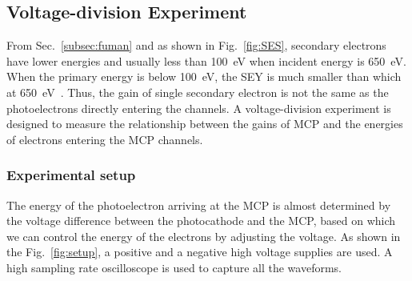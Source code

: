 \subsection{Voltage-division Experiment}\label{sec:gain}
From Sec.~\ref{subsec:fuman} and as shown in Fig.~\ref{fig:SES},
secondary electrons have lower energies and usually less than \SI{100}{eV} when incident energy is \SI{650}{eV}.
When the primary energy is below \SI{100}{eV}, the SEY is much smaller than which at \SI{650}{eV}~\cite{2012An}.
Thus, the gain of single secondary electron is not the same as the photoelectrons directly entering the channels.
A voltage-division experiment is designed to measure the relationship
between the gains of MCP and the energies of electrons entering the MCP channels.

\subsubsection{Experimental setup}
The energy of the photoelectron arriving at the MCP is almost determined by the voltage difference
between the photocathode and the MCP, based on which we can control the energy of the electrons by adjusting the voltage.
As shown in the Fig.~\ref{fig:setup}, a positive and a negative high voltage supplies are used.
A high sampling rate oscilloscope is used to capture all the waveforms.


